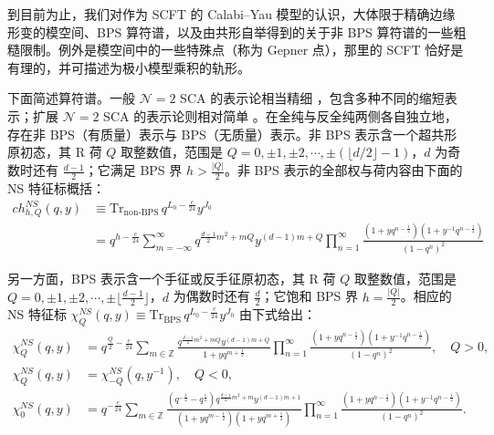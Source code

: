 
到目前为止，我们对作为 SCFT 的 Calabi--Yau 模型的认识，大体限于精确边缘形变的模空间、BPS 算符谱，以及由共形自举得到的关于非 BPS 算符谱的一些粗糙限制。例外是模空间中的一些特殊点（称为 Gepner 点），那里的 SCFT 恰好是有理的，并可描述为极小模型乘积的轨形。

下面简述算符谱。一般 $\mathcal{N}=2$ SCA 的表示论相当精细 \cite{r32,r33}，包含多种不同的缩短表示；扩展 $\mathcal{N}=2$ SCA 的表示论则相对简单 \cite{r27,r28}。在全纯与反全纯两侧各自独立地，存在非 BPS（有质量）表示与 BPS（无质量）表示。非 BPS 表示含一个超共形原初态，其 R 荷 $Q$ 取整数值，范围是 $Q=0,\pm1,\pm2,\cdots,\pm(\lfloor d/2\rfloor-1)$，$d$ 为奇数时还有 $\frac{d-1}{2}$；它满足 BPS 界 $h>\frac{|Q|}{2}$。非 BPS 表示的全部权与荷内容由下面的 NS 特征标概括：
\begin{equation}
  \label{eq:4-36}
  \begin{aligned}
    ch^{NS}_{h,Q}(q,y)&\equiv\mathrm{Tr}_{\text{non-BPS}}\,q^{L_0-\frac{c}{24}}y^{J_0}\\
    &=q^{h-\frac{c}{24}}\sum_{m=-\infty}^{\infty}q^{\frac{d-1}{2}m^2+mQ}y^{(d-1)m+Q}
    \prod_{n=1}^{\infty}\frac{(1+yq^{n-\frac12})(1+y^{-1}q^{n-\frac12})}{(1-q^n)^2}
  \end{aligned}
\end{equation}

另一方面，BPS 表示含一个手征或反手征原初态，其 R 荷 $Q$ 取整数值，范围是 $Q=0,\pm1,\pm2,\cdots,\pm\big\lfloor\frac{d-1}{2}\big\rfloor$，$d$ 为偶数时还有 $\frac d2$；它饱和 BPS 界 $h=\frac{|Q|}{2}$。相应的 NS 特征标 $\chi^{NS}_Q(q,y)\equiv\mathrm{Tr}_{\text{BPS}}\,q^{L_0-\frac c{24}}y^{J_0}$ 由下式给出：
\begin{equation}
  \label{eq:4-37}
  \begin{aligned}
    \chi^{NS}_Q(q,y)&=q^{\frac Q2-\frac c{24}}\sum_{m\in\mathbb{Z}}\frac{q^{\frac{d-1}{2}m^2+mQ}y^{(d-1)m+Q}}{1+yq^{m+\frac12}}
      \prod_{n=1}^{\infty}\frac{(1+yq^{n-\frac12})(1+y^{-1}q^{n-\frac12})}{(1-q^n)^2},\quad Q>0,\\
    \chi^{NS}_Q(q,y)&=\chi^{NS}_{-Q}(q,y^{-1}),\quad Q<0,\\
    \chi^{NS}_0(q,y)&=q^{-\frac c{24}}\sum_{m\in\mathbb{Z}}\frac{(q^{-\frac12}-q^{\frac12})q^{\frac{d-1}{2}m^2+m}y^{(d-1)m+1}}{(1+yq^{m-\frac12})(1+yq^{m+\frac12})}
      \prod_{n=1}^{\infty}\frac{(1+yq^{n-\frac12})(1+y^{-1}q^{n-\frac12})}{(1-q^n)^2}.
  \end{aligned}
\end{equation}

